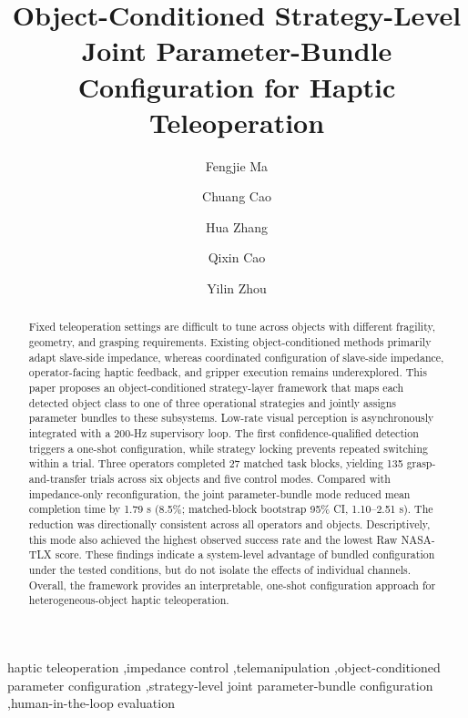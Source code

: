 \documentclass[5p,times]{elsarticle}
\begin{document}
\begin{frontmatter}
\title{Object-Conditioned Strategy-Level Joint Parameter-Bundle Configuration for Haptic Teleoperation}

\author[a]{Fengjie Ma}
\author[b]{Chuang Cao}
\author[a]{Hua Zhang}
\author[b]{Qixin Cao}
\author[a]{Yilin Zhou}


\begin{abstract}
Fixed teleoperation settings are difficult to tune across objects with different fragility, geometry, and grasping requirements. Existing object-conditioned methods primarily adapt slave-side impedance, whereas coordinated configuration of slave-side impedance, operator-facing haptic feedback, and gripper execution remains underexplored. This paper proposes an object-conditioned strategy-layer framework that maps each detected object class to one of three operational strategies and jointly assigns parameter bundles to these subsystems. Low-rate visual perception is asynchronously integrated with a 200-Hz supervisory loop. The first confidence-qualified detection triggers a one-shot configuration, while strategy locking prevents repeated switching within a trial. Three operators completed 27 matched task blocks, yielding 135 grasp-and-transfer trials across six objects and five control modes. Compared with impedance-only reconfiguration, the joint parameter-bundle mode reduced mean completion time by 1.79 s (8.5\%; matched-block bootstrap 95\% CI, 1.10--2.51 s). The reduction was directionally consistent across all operators and objects. Descriptively, this mode also achieved the highest observed success rate and the lowest Raw NASA-TLX score. These findings indicate a system-level advantage of bundled configuration under the tested conditions, but do not isolate the effects of individual channels. Overall, the framework provides an interpretable, one-shot configuration approach for heterogeneous-object haptic teleoperation.
\end{abstract}

\begin{keyword}
haptic teleoperation \sep impedance control \sep telemanipulation \sep object-conditioned parameter configuration \sep strategy-level joint parameter-bundle configuration \sep human-in-the-loop evaluation
\end{keyword}
\end{frontmatter}












\end{document}
